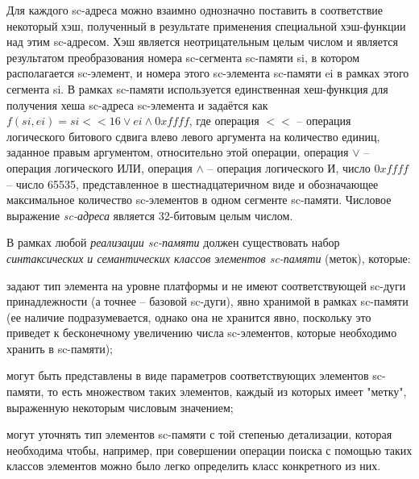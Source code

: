 Для каждого sc-адреса можно взаимно однозначно поставить в соответствие некоторый хэш, полученный в результате применения специальной хэш-функции над этим sc-адресом. Хэш является неотрицательным целым числом и является результатом преобразования номера sc-сегмента sc-памяти si, в котором располагается sc-элемент, и номера этого sc-элемента sc-памяти ei в рамках этого сегмента si. В рамках sc-памяти используется единственная хеш-функция для получения хеша sc-адреса sc-элемента и задаётся как $f(si, ei) = si << 16 \vee ei \wedge 0xffff$, где операция $<<$ -- операция логического битового сдвига влево левого аргумента на количество единиц, заданное правым аргументом, относительно этой операции, операция $\vee$ -- операция логического ИЛИ, операция $\wedge$ -- операция логического И, число $0xffff$ -- число 65535, представленное в шестнадцатеричном виде и обозначающее максимальное количество sc-элементов в одном сегменте sc-памяти. Числовое выражение \textit{sc-адреса} является 32-битовым целым числом.

\begin{SCn}
\end{SCn}

В рамках любой \textit{реализации sc-памяти} должен существовать набор \textit{синтаксических и семантических классов элементов sc-памяти} (меток), которые:
\begin{textitemize}
    \item задают тип элемента на уровне платформы и не имеют соответствующей sc-дуги принадлежности (а точнее -- базовой sc-дуги), явно хранимой в рамках sc-памяти (ее наличие подразумевается, однако она не хранится явно, поскольку это приведет к бесконечному увеличению числа sc-элементов, которые необходимо хранить в sc-памяти);
    \item могут быть представлены в виде параметров соответствующих элементов sc-памяти, то есть множеством таких элементов, каждый из которых имеет "метку", выраженную некоторым числовым значением;
    \item могут уточнять тип элементов sc-памяти с той степенью детализации, которая необходима чтобы, например, при совершении операции поиска с помощью таких классов элементов можно было легко определить класс конкретного из них.
\end{textitemize}

